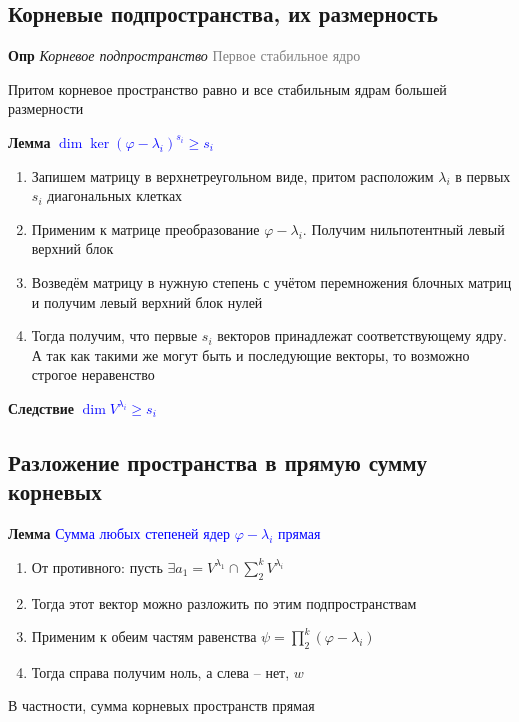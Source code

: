 \subsection{Корневые подпространства, их размерность}

\textbf{Опр} \textit{Корневое подпространство} \textcolor{gray}{Первое стабильное ядро}

Притом корневое пространство равно и все стабильным ядрам большей размерности

\textbf{Лемма} \textcolor{blue}{$\dim \ker (\varphi - \lambda_i)^{s_i} \geq s_i$}

\begin{enumerate}
    \item Запишем матрицу в верхнетреугольном виде, притом расположим $\lambda_i$ в первых $s_i$ диагональных
    клетках
    \item Применим к матрице преобразование $\varphi - \lambda_i$.
    Получим нильпотентный левый верхний блок
    \item Возведём матрицу в нужную степень с учётом перемножения блочных матриц и получим левый верхний блок нулей
    \item Тогда получим, что первые $s_i$ векторов принадлежат соответствующему ядру.
    А так как такими же могут быть и последующие векторы, то возможно строгое неравенство
\end{enumerate}

\textbf{Следствие} \textcolor{blue}{$\dim V^{\lambda_i} \geq s_i$}

\subsection{Разложение пространства в прямую сумму корневых}

\textbf{Лемма} \textcolor{blue}{Сумма любых степеней ядер $\varphi - \lambda_i$ прямая}

\begin{enumerate}
    \item От противного: пусть $\exists a_1 = V^{\lambda_1} \cap \sum_2^k V^{\lambda_i}$
    \item Тогда этот вектор можно разложить по этим подпространствам
    \item Применим к обеим частям равенства $\psi = \prod_2^k (\varphi - \lambda_i)$
    \item Тогда справа получим ноль, а слева -- нет, $w$
\end{enumerate}

В частности, сумма корневых пространств прямая

